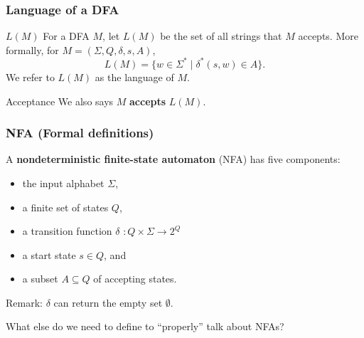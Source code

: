 \begin{frame}
  \frametitle{Language of a DFA}

  \begin{block}{$L(M)$}
    For a DFA $M$, let $L(M)$ be the set of all strings that $M$
    accepts.  More formally, for $M=(\Sigma,Q,\delta,s,A)$,
    \[
    L(M)=\{w\in\Sigma^* \;|\; \delta^*(s,w)\in A\}.
    \]
    We refer to $L(M)$ as the language of $M$.
  \end{block}

  \begin{block}{Acceptance}
    We also says $M$ {\color{red}\bf accepts} $L(M)$.
  \end{block}
  
\end{frame}





\begin{frame}
  \frametitle{NFA (Formal definitions)}

  A {\color{red}\bf nondeterministic finite-state automaton} (NFA) has
  five components:

  \begin{itemize}
  \item the input alphabet $\Sigma$, \pause
  \item a finite set of states $Q$, \pause
  \item a transition function $\delta$ \pause $:Q\times\Sigma \longrightarrow 2^Q$ \pause
  \item a start state $s\in Q$, and
  \item a subset $A\subseteq Q$ of accepting states.
  \end{itemize}

  \pause

  Remark: $\delta$ can return the empty set $\emptyset$.

  \pause

  What else do we need to define to ``properly'' talk about NFAs?
\end{frame}

